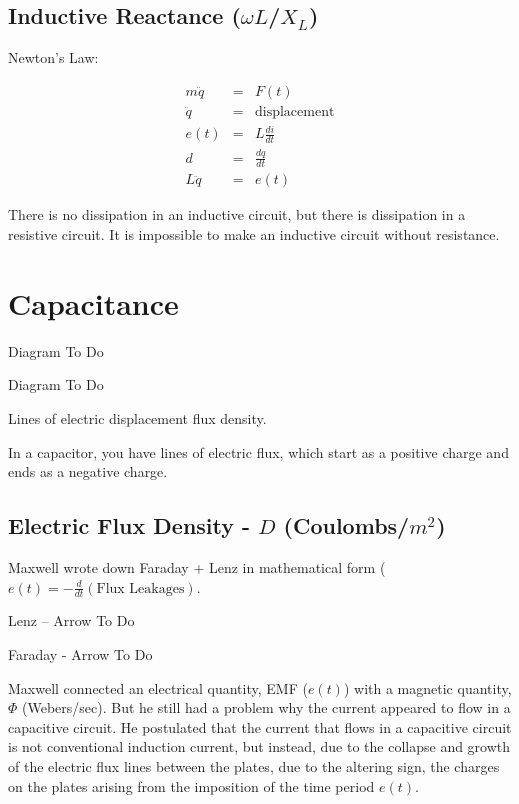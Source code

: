 \documentclass[a4paper,12pt]{article}
\begin{document}
\subsection{Inductive Reactance ($\omega L$/$X_{L}$)}

Newton's Law:

\begin{eqnarray*}
m \ddot{q} & = & F(t) \\
\ddot{q} & = & \mbox{displacement} \\
e(t) & = & L \frac{di}{dt} \\
d & = & \frac{dq}{dt} \\
L \ddot{q} & = & e(t)
\end{eqnarray*}

There is no dissipation in an inductive circuit, but there is
dissipation in a resistive circuit. It is impossible to make an
inductive circuit without resistance.

\section{Capacitance}

\begin{table}[hbtp]

Diagram To Do

\end{table}

\begin{table}[hbtp]

Diagram To Do

\end{table}

Lines of electric displacement flux density.

In a capacitor, you have lines of electric flux, which start as a
positive charge and ends as a negative charge.

\subsection{Electric Flux Density - $D$ (Coulombs/$m^{2}$)}

Maxwell wrote down Faraday + Lenz in mathematical form ($e(t) = -
\frac{d}{dt} (\mbox{Flux Leakages})$.

Lenz -- Arrow To Do %

Faraday - Arrow To Do %

Maxwell connected an electrical quantity, EMF ($e(t)$) with a magnetic
quantity, $\Phi$ (Webers/sec). But he still had a problem why the
current appeared to flow in a capacitive circuit. He postulated that the
current that flows in a capacitive circuit is not conventional induction
current, but instead, due to the collapse and growth of the electric
flux lines between the plates, due to the altering sign, the charges on
the plates arising from the imposition of the time period $e(t)$.
\end{document}
